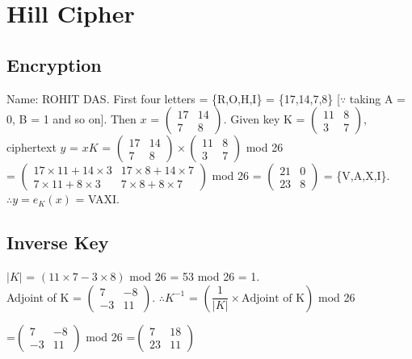 \documentclass[12pt]{article}
\begin{document}
\section{Hill Cipher}
\begin{large}
\subsection{Encryption}
Name: ROHIT DAS. First four letters = \{R,O,H,I\} = \{17,14,7,8\} [$\because$ taking A = 0, B = 1 and so on].
Then $x$ = 
$\begin{pmatrix}
17&14\\7&8
\end{pmatrix}$.
Given key K = $\begin{pmatrix}
11&8\\3&7
\end{pmatrix}$,\\ 
ciphertext $y$ = $xK$ = 
$\begin{pmatrix}
17&14\\7&8
\end{pmatrix}
\times
\begin{pmatrix}
11&8\\3&7
\end{pmatrix}$ mod 26\\
= $\begin{pmatrix}
17\times11+14\times3 & 17\times8+14\times7\\
7\times11+8\times3 & 7\times8+8\times7
\end{pmatrix}$ mod 26
= $\begin{pmatrix}
21&0\\23&8
\end{pmatrix}$
= \{V,A,X,I\}.\\
$\therefore y = e_K(x)$ = VAXI.

\subsection{Inverse Key}
$|K|$ = $(11\times7-3\times8)$ mod 26 = 53 mod 26 = 1.\\
Adjoint of K
= $\begin{pmatrix}
7&-8\\-3&11
\end{pmatrix}$.
$\therefore K^{-1}$
= $\left( \dfrac{1}{|K|}\times \text{Adjoint of K} \right)$ mod 26
 
=$\begin{pmatrix}
7&-8\\-3&11
\end{pmatrix}$ mod 26
=$\begin{pmatrix}
7&18\\23&11
\end{pmatrix}$


\end{large}
\end{document}

